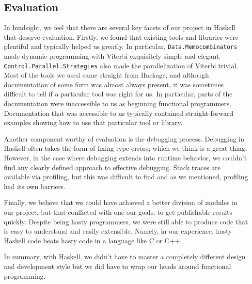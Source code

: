 \documentclass[preprint,nonatbib,blockstyle,nocopyrightspace,times]{sigplanconf}
\begin{document}
\subsection{Evaluation}
In hindsight, we feel that there are several key facets of our project in 
Haskell that deserve evaluation.
Firstly, we found that existing tools and libraries were plentiful and 
typically helped us greatly.
In particular, \texttt{Data.Memocombinators} made dynamic 
programming with Viterbi exquisitely simple and elegant.
\texttt{Control.Parallel.Strategies} also made the parallelization of Viterbi trivial.
Most of the tools we used came straight from Hackage, and although 
documentation of some form was almost always present, it was sometimes 
difficult to tell if a particular tool was right for us.
In particular, parts of the documentation were inaccessible to us as beginning 
functional programmers.
Documentation that was accessible to us typically contained straight-forward 
examples showing how to use that particular tool or library.

Another component worthy of evaluation is the debugging process.
Debugging in Haskell often takes the form of fixing type errors; which we think 
is a great thing.
However, in the case where debugging extends into runtime behavior, we couldn't 
find any clearly defined approach to effective debugging.
Stack traces are available via profiling, but this was difficult to find and 
as we mentioned, profiling had its own barriers.

Finally, we believe that we could have achieved a better division of modules in 
our project, but that conflicted with one our goals: to get publishable results
quickly. Despite being hasty programmers, we were still able to produce code 
that is easy to understand and easily extensible. Namely, in our experience, 
hasty Haskell code beats hasty code in a language like C or C++.

In summary, with Haskell, we didn't have to master a completely different 
design and development style but we did have to wrap our heads around 
functional programming.


%  
%  
%  
\end{document}
